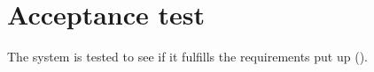 \chapter{Acceptance test} \label{chap:acceptanceTest}
The system is tested to see if it fulfills the requirements put up ().

